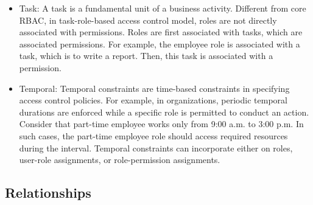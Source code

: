 \begin{itemize}
  \item Task: A task is a fundamental unit of a business activity. Different from core RBAC, in task-role-based access control model, roles are not directly associated with permissions. Roles are first associated with tasks, which are associated permissions. For example, the employee role is associated with a task, which is to write a report. Then, this task is associated with a permission.

  \item Temporal:  Temporal constraints are time-based constraints in specifying access
	control policies. For example, in organizations, 	periodic temporal durations are enforced while a
	specific role is permitted to conduct an action. Consider that part-time employee works only from 9:00 a.m. to 3:00 p.m.
	In such cases, the part-time employee role should access required resources during the interval. 
	Temporal constraints can incorporate either on roles, user-role assignments, or role-permission assignments.   
	
\end{itemize}

\subsection{Relationships}
